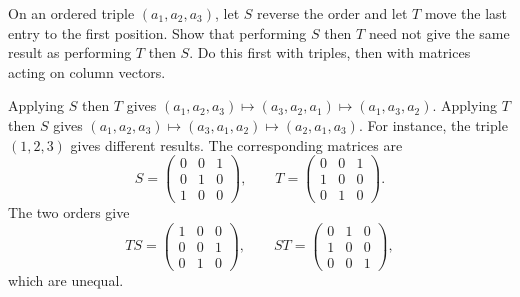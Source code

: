\begin{problem}\label{ex:01:reshuffle-order}
On an ordered triple $(a_1,a_2,a_3)$, let $S$ reverse the order and let
$T$ move the last entry to the first position. Show that performing $S$
then $T$ need not give the same result as performing $T$ then $S$.
Do this first with triples, then with matrices acting on column vectors.
\end{problem}
\begin{solution}
Applying $S$ then $T$ gives
$(a_1,a_2,a_3)\mapsto(a_3,a_2,a_1)\mapsto(a_1,a_3,a_2)$.
Applying $T$ then $S$ gives
$(a_1,a_2,a_3)\mapsto(a_3,a_1,a_2)\mapsto(a_2,a_1,a_3)$.
For instance, the triple $(1,2,3)$ gives different results.
The corresponding matrices are
\[
S=\begin{pmatrix}0&0&1\\0&1&0\\1&0&0\end{pmatrix},\qquad
T=\begin{pmatrix}0&0&1\\1&0&0\\0&1&0\end{pmatrix}.
\]
The two orders give
\[
TS=\begin{pmatrix}1&0&0\\0&0&1\\0&1&0\end{pmatrix},\qquad
ST=\begin{pmatrix}0&1&0\\1&0&0\\0&0&1\end{pmatrix},
\]
which are unequal.
\end{solution}

